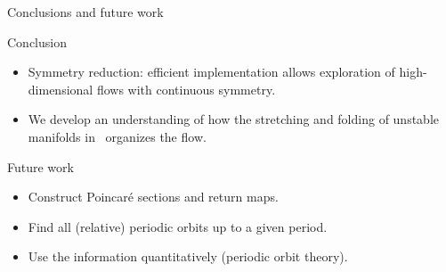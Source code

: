 \documentclass{beamer}
\begin{document}
 \begin{frame}{Conclusions and future work}

\begin{block}{Conclusion}
  \begin{itemize}
   \item Symmetry reduction: efficient implementation allows
   exploration of high-dimensional flows with continuous
   symmetry.
   \item We develop an understanding of how the stretching and folding
  	of unstable manifolds in \KSe\ organizes the flow.
  \end{itemize}
\end{block}


\begin{block}{Future work}
\begin{itemize}
  \item Construct Poincar\'e sections and return maps.
  \item Find all (relative) periodic orbits up to a given period.
  \item Use the information quantitatively (periodic orbit theory).
\end{itemize}
\end{block}

\end{frame}
\end{document}
